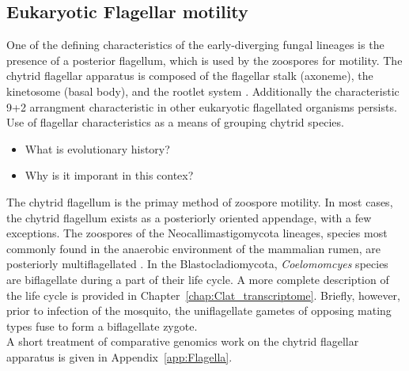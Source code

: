 \subsection{Eukaryotic Flagellar motility}
One of the defining characteristics of the early-diverging fungal lineages is the presence of a posterior flagellum, which is used by the zoospores for motility. The chytrid flagellar apparatus is composed of the flagellar stalk (axoneme), the kinetosome (basal body), and the rootlet system \cite{Barr1981}. Additionally the characteristic 9+2 arrangment characteristic in other eukaryotic flagellated organisms persists.\\
\indent Use of flagellar characteristics as a means of grouping chytrid species.
\begin{itemize} 
  \item What is evolutionary history?
  \item Why is it imporant in this contex?
\end{itemize}
\indent The chytrid flagellum is the primay method of zoospore motility. In most cases, the chytrid flagellum exists as a posteriorly oriented appendage, with a few exceptions. The zoospores of the Neocallimastigomycota lineages, species most commonly found in the anaerobic environment of the mammalian rumen, are posteriorly multiflagellated \cite{}. In the Blastocladiomycota, \textit{Coelomomcyes} species are biflagellate during a part of their life cycle. A more complete description of the life cycle is provided in Chapter~\ref{chap:Clat_transcriptome}. Briefly, however, prior to infection of the mosquito, the uniflagellate gametes of opposing mating types fuse to form a biflagellate zygote. \cite{}\\ 
\indent A short treatment of comparative genomics work on the chytrid flagellar apparatus is given in Appendix~\ref{app:Flagella}.\\

